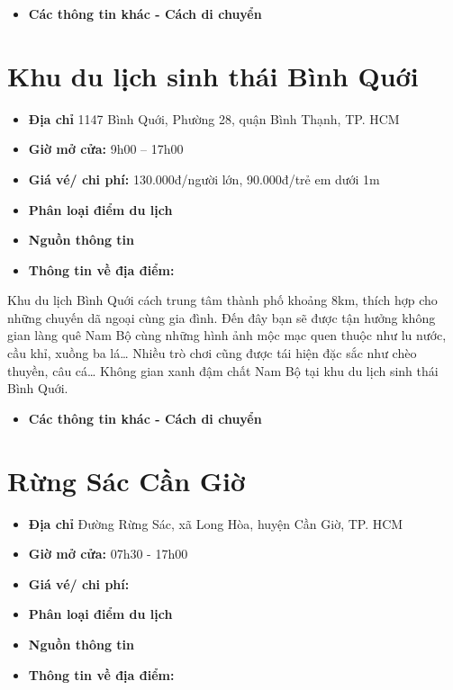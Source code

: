 \documentclass{article}
\begin{document}
\begin{itemize}
    \item{\textbf{Các thông tin khác - Cách di chuyển}}
\end{itemize}

\section{Khu du lịch sinh thái Bình Quới}
\begin{itemize}
    \item{\textbf{Địa chỉ}} 1147 Bình Quới, Phường 28, quận Bình Thạnh, TP. HCM
    \item{\textbf{Giờ mở cửa:}} 9h00 – 17h00
    \item{\textbf{Giá vé/ chi phí:}} 130.000đ/người lớn, 90.000đ/trẻ em dưới 1m
    \item{\textbf{Phân loại điểm du lịch} }
    \item{\textbf{Nguồn thông tin}}
    \item{\textbf{Thông tin về địa điểm:}}
\end{itemize}

Khu du lịch Bình Quới cách trung tâm thành phố khoảng 8km, thích hợp cho những chuyến dã ngoại cùng gia đình. Đến đây bạn sẽ được tận hưởng không gian làng quê Nam Bộ cùng những hình ảnh mộc mạc quen thuộc như lu nước, cầu khỉ, xuồng ba lá… Nhiều trò chơi cũng được tái hiện đặc sắc như chèo thuyền, câu cá… Không gian xanh đậm chất Nam Bộ tại khu du lịch sinh thái Bình Quới.

\begin{itemize}
    \item{\textbf{Các thông tin khác - Cách di chuyển}}
\end{itemize}

\section{Rừng Sác Cần Giờ}
\begin{itemize}
    \item{\textbf{Địa chỉ}} Đường Rừng Sác, xã Long Hòa, huyện Cần Giờ, TP. HCM
    \item{\textbf{Giờ mở cửa:}} 07h30 - 17h00
    \item{\textbf{Giá vé/ chi phí:}}
    \item{\textbf{Phân loại điểm du lịch} }
    \item{\textbf{Nguồn thông tin}}
    \item{\textbf{Thông tin về địa điểm:}}
\end{itemize}
\end{document}

